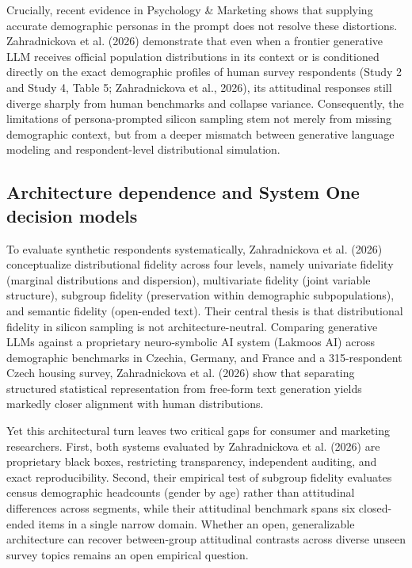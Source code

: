 \documentclass[
  11pt,
  letterpaper,
]{article}
\begin{document}
Crucially, recent evidence in Psychology \& Marketing shows that
supplying accurate demographic personas in the prompt does not resolve
these distortions. Zahradnickova et al. (2026) demonstrate that even
when a frontier generative LLM receives official population
distributions in its context or is conditioned directly on the exact
demographic profiles of human survey respondents (Study 2 and Study 4,
Table 5; Zahradnickova et al., 2026), its attitudinal responses still
diverge sharply from human benchmarks and collapse variance.
Consequently, the limitations of persona-prompted silicon sampling stem
not merely from missing demographic context, but from a deeper mismatch
between generative language modeling and respondent-level distributional
simulation.

\subsection{Architecture dependence and System One decision
models}\label{architecture-dependence-and-system-one-decision-models}

To evaluate synthetic respondents systematically, Zahradnickova et al.
(2026) conceptualize distributional fidelity across four levels, namely
univariate fidelity (marginal distributions and dispersion),
multivariate fidelity (joint variable structure), subgroup fidelity
(preservation within demographic subpopulations), and semantic fidelity
(open-ended text). Their central thesis is that distributional fidelity
in silicon sampling is not architecture-neutral. Comparing generative
LLMs against a proprietary neuro-symbolic AI system (Lakmoos AI) across
demographic benchmarks in Czechia, Germany, and France and a
315-respondent Czech housing survey, Zahradnickova et al. (2026) show
that separating structured statistical representation from free-form
text generation yields markedly closer alignment with human
distributions.

Yet this architectural turn leaves two critical gaps for consumer and
marketing researchers. First, both systems evaluated by Zahradnickova et
al. (2026) are proprietary black boxes, restricting transparency,
independent auditing, and exact reproducibility. Second, their empirical
test of subgroup fidelity evaluates census demographic headcounts
(gender by age) rather than attitudinal differences across segments,
while their attitudinal benchmark spans six closed-ended items in a
single narrow domain. Whether an open, generalizable architecture can
recover between-group attitudinal contrasts across diverse unseen survey
topics remains an open empirical question.
\end{document}
